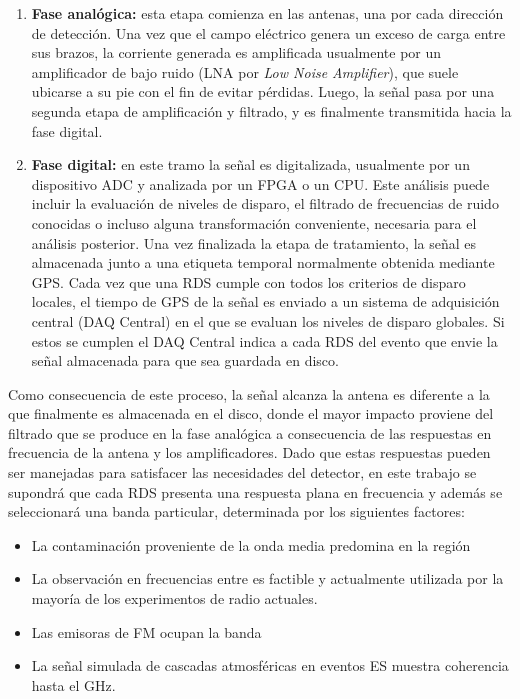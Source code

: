 	\begin{enumerate}
		\item \textbf{Fase anal\'ogica:} esta etapa comienza en las antenas, una por cada direcci\'on de detecci\'on. Una vez que el campo el\'ectrico genera un exceso de carga entre sus brazos, la corriente generada es amplificada usualmente por un amplificador de bajo ruido (LNA por \emph{Low Noise Amplifier}), que suele ubicarse a su pie con el fin de evitar p\'erdidas. Luego, la se\~nal pasa por una segunda etapa de amplificaci\'on y filtrado, y es finalmente transmitida hacia la fase digital.
		\item \textbf{Fase digital:} en este tramo la se\~nal es digitalizada, usualmente por un dispositivo ADC y analizada por un FPGA o un CPU. Este an\'alisis puede incluir la evaluaci\'on de niveles de disparo, el filtrado de frecuencias de ruido conocidas o incluso alguna transformaci\'on conveniente, necesaria para el an\'alisis posterior. Una vez finalizada la etapa de tratamiento, la se\~nal es almacenada junto a una etiqueta temporal normalmente obtenida mediante GPS. 
		Cada vez que una RDS cumple con todos los criterios de disparo locales, el tiempo de GPS de la se\~nal es enviado a un sistema de adquisici\'on central (DAQ Central) en el que se evaluan los niveles de disparo globales.
		Si estos se cumplen el DAQ Central indica a cada RDS del evento que envie la se\~nal almacenada para que sea guardada en disco.
	\end{enumerate}
	
	Como consecuencia de este proceso, la se\~nal alcanza la antena es diferente a la que finalmente es almacenada en el disco, donde el mayor impacto proviene del filtrado que se produce en la fase anal\'ogica a consecuencia de las respuestas en frecuencia de la antena y los amplificadores.
	Dado que estas respuestas pueden ser manejadas para satisfacer las necesidades del detector, en este trabajo se supondr\'a que cada RDS presenta una respuesta plana en frecuencia y adem\'as se seleccionar\'a una banda particular, determinada por los siguientes factores:
	\begin{itemize}
	 \item La contaminaci\'on proveniente de la onda media predomina en la regi\'on 
	 \item La observaci\'on en frecuencias entre  es factible y actualmente utilizada por la mayor\'ia de los experimentos de radio actuales.
	 \item Las emisoras de FM ocupan la banda 
	 \item La se\~nal simulada de cascadas atmosf\'ericas en eventos ES muestra coherencia hasta el GHz.
	\end{itemize}
	
